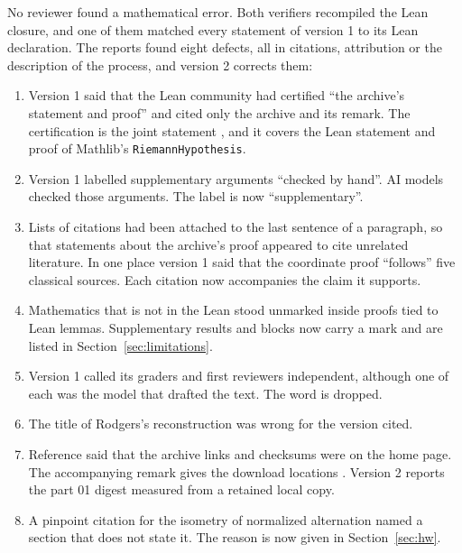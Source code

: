 \documentclass[11pt]{amsart}
\newcommand{\lean}[1]{\texttt{#1}}
\newcommand{\notlean}{supplementary}
\theoremstyle{definition}
\theoremstyle{remark}
\begin{document}
No reviewer found a mathematical error. Both verifiers recompiled the Lean
closure, and one of them matched every statement of version 1 to its Lean
declaration. The reports found
eight defects, all in citations, attribution or the description of the
process, and version 2 corrects them:
\begin{enumerate}
\item Version 1 said that the Lean community had certified ``the archive's
  statement and proof'' and cited only the archive and its remark. The
  certification is the joint statement \cite{JointStatement}, and it covers
  the Lean statement and proof of Mathlib's \lean{RiemannHypothesis}.
\item Version 1 labelled supplementary arguments ``checked by hand''. AI models checked
  those arguments. The label is now ``\notlean''.
\item Lists of citations had been attached to the last sentence of a
  paragraph, so that statements about the archive's proof appeared to cite
  unrelated literature. In one place version 1 said that the coordinate
  proof ``follows'' five classical sources. Each citation now accompanies
  the claim it supports.
\item Mathematics that is not in the Lean stood unmarked inside proofs tied
  to Lean lemmas. Supplementary results and blocks now carry a mark and
  are listed in
  Section~\ref{sec:limitations}.
\item Version 1 called its graders and first reviewers independent, although
  one of each was the model that drafted the text. The word is dropped.
\item The title of Rodgers's reconstruction \cite{Rodgers} was wrong for the
  version cited.
\item Reference \cite{AlpogeArchive} said that the archive links and
  checksums were on the home page. The accompanying remark gives the
  download locations \cite{AlpogeRemark}. Version 2 reports the part 01
  digest measured from a retained local copy.
\item A pinpoint citation for the isometry of normalized alternation named a
  section that does not state it. The reason is now given in
  Section~\ref{sec:hw}.
\end{enumerate}
\end{document}
